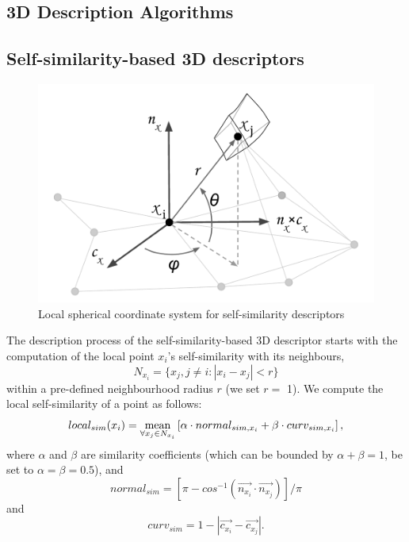 \begin{appendix}

\section{3D Description Algorithms}\label{apdx:descriptors}

\subsection{Self-similarity-based 3D descriptors}\label{apdx:self-similarity}

\begin{figure}[htbp]
	\vspace{-2mm}
	\centering
	\includegraphics[width=0.65\columnwidth]{figures/spherical-coord}
	\caption{Local spherical coordinate system for self-similarity descriptors}
	\label{fig:spherical-coordinate}
\end{figure}

The description process of the self-similarity-based 3D descriptor \cite{huang2012point} starts with the computation of the local point $x_i$'s self-similarity with its neighbours,
\begin{equation}
N_{x_i} = \{x_j, j \neq i : |x_i - x_j| < r\}
\end{equation}
within a pre-defined neighbourhood radius $r$ (we set $r =$ 1). We compute the local self-similarity of a point as follows:
\begin{equation}
local_{sim} (x_i) = \operatorname*{mean}_{\forall x_j \in N_{x_i}}  \left[ \alpha \cdot normal_{sim, x_i} + \beta \cdot curv_{sim, x_i} \right],
\end{equation}
where $\alpha$ and $\beta$ are similarity coefficients (which can be bounded by $\alpha + \beta =1$, be set to $\alpha = \beta = 0.5$), and
\begin{equation}
normal_{sim} = \left[ \pi - cos^{-1}(\vec{n_{x_i}} \cdot \vec{n_{x_j}}) \right] /\pi
\end{equation}
and
\begin{equation}
curv_{sim} = 1 - |\vec{c_{x_i}} -  \vec{c_{x_j}}|.
\end{equation}


\end{appendix}
